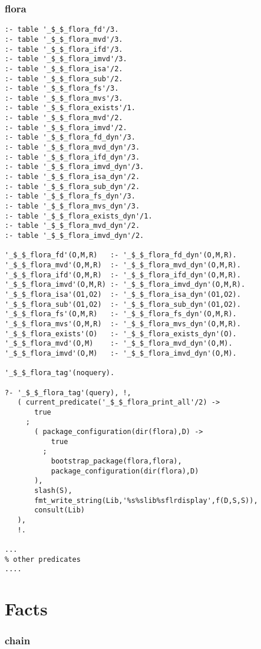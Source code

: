 \subsubsection*{flora}

\begin{Verbatim}
:- table '_$_$_flora_fd'/3.
:- table '_$_$_flora_mvd'/3.
:- table '_$_$_flora_ifd'/3.
:- table '_$_$_flora_imvd'/3.
:- table '_$_$_flora_isa'/2.
:- table '_$_$_flora_sub'/2.
:- table '_$_$_flora_fs'/3.
:- table '_$_$_flora_mvs'/3.
:- table '_$_$_flora_exists'/1.
:- table '_$_$_flora_mvd'/2.
:- table '_$_$_flora_imvd'/2.
:- table '_$_$_flora_fd_dyn'/3.
:- table '_$_$_flora_mvd_dyn'/3.
:- table '_$_$_flora_ifd_dyn'/3.
:- table '_$_$_flora_imvd_dyn'/3.
:- table '_$_$_flora_isa_dyn'/2.
:- table '_$_$_flora_sub_dyn'/2.
:- table '_$_$_flora_fs_dyn'/3.
:- table '_$_$_flora_mvs_dyn'/3.
:- table '_$_$_flora_exists_dyn'/1.
:- table '_$_$_flora_mvd_dyn'/2.
:- table '_$_$_flora_imvd_dyn'/2.

'_$_$_flora_fd'(O,M,R)   :- '_$_$_flora_fd_dyn'(O,M,R).
'_$_$_flora_mvd'(O,M,R)  :- '_$_$_flora_mvd_dyn'(O,M,R).
'_$_$_flora_ifd'(O,M,R)  :- '_$_$_flora_ifd_dyn'(O,M,R).
'_$_$_flora_imvd'(O,M,R) :- '_$_$_flora_imvd_dyn'(O,M,R).
'_$_$_flora_isa'(O1,O2)  :- '_$_$_flora_isa_dyn'(O1,O2).
'_$_$_flora_sub'(O1,O2)  :- '_$_$_flora_sub_dyn'(O1,O2).
'_$_$_flora_fs'(O,M,R)   :- '_$_$_flora_fs_dyn'(O,M,R).
'_$_$_flora_mvs'(O,M,R)  :- '_$_$_flora_mvs_dyn'(O,M,R).
'_$_$_flora_exists'(O)   :- '_$_$_flora_exists_dyn'(O).
'_$_$_flora_mvd'(O,M)    :- '_$_$_flora_mvd_dyn'(O,M).
'_$_$_flora_imvd'(O,M)   :- '_$_$_flora_imvd_dyn'(O,M).

'_$_$_flora_tag'(noquery).

?- '_$_$_flora_tag'(query), !,
   ( current_predicate('_$_$_flora_print_all'/2) ->
       true
     ;
       ( package_configuration(dir(flora),D) ->
           true
         ;
           bootstrap_package(flora,flora),
           package_configuration(dir(flora),D)
       ),
       slash(S),
       fmt_write_string(Lib,'%s%slib%sflrdisplay',f(D,S,S)),
       consult(Lib)
   ),
   !.

...
% other predicates
....
\end{Verbatim}

\section{Facts}

\subsubsection*{chain}

